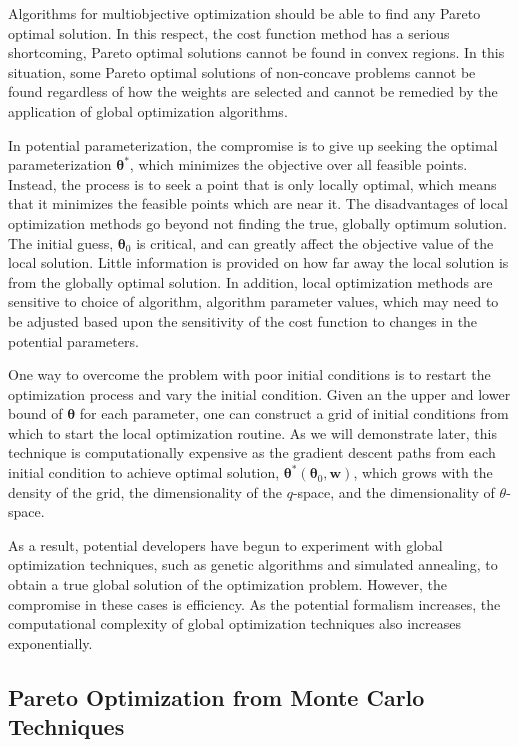 Algorithms for multiobjective optimization should be able to find any Pareto optimal solution.  In this respect, the cost function method has a serious shortcoming, Pareto optimal solutions cannot be found in convex regions.  In this situation, some Pareto optimal solutions of non-concave problems cannot be found regardless of how the weights are selected and cannot be remedied by the application of global optimization algorithms.

In potential parameterization, the compromise is to give up seeking the optimal parameterization $\bm{\theta}^*$, which minimizes the objective over all feasible points.  Instead, the process is to seek a point that is only locally optimal, which means that it minimizes the feasible points which are near it.  The disadvantages of local optimization methods go beyond not finding the true, globally optimum solution.  The initial guess, $\bm{\theta}_0$ is critical, and can greatly affect the objective value of the local solution.  Little information is provided on how far away the local solution is from the globally optimal solution.  In addition, local optimization methods are sensitive to choice of algorithm, algorithm parameter values, which may need to be adjusted based upon the sensitivity of the cost function to changes in the potential parameters.

One way to overcome the problem with poor initial conditions is to restart the optimization process and vary the initial condition.  Given an the upper and lower bound of $\bm{\theta}$ for each parameter, one can construct a grid of initial conditions from which to start the local optimization routine.  As we will demonstrate later, this technique is computationally expensive as the gradient descent paths from each initial condition to achieve optimal solution, $\bm{\theta}^*(\bm{\theta}_0,\bm{w})$, which grows with the density of the grid, the dimensionality of the $q$-space, and the dimensionality of $\theta$-space.

As a result, potential developers have begun to experiment with global optimization techniques, such as genetic algorithms and simulated annealing\cite{martinez2013_fitting,martinez2016_posmat}, to obtain a true global solution of the optimization problem.  However, the compromise in these cases is efficiency.  As the potential formalism increases, the computational complexity of global optimization techniques also increases exponentially.

\subsection{Pareto Optimization from Monte Carlo Techniques}
\label{sec:potdev_montecarlo}

